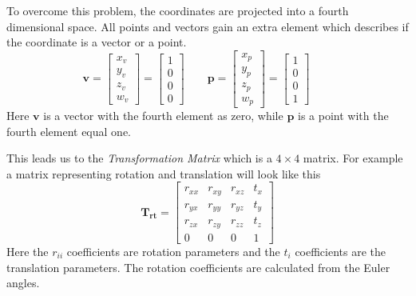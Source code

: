 To overcome this problem, the coordinates are projected into a fourth dimensional space.
All points and vectors gain an extra element which describes if the coordinate is a vector
or a point. 
\begin{equation}
        \mathbf{v} = \left[ \begin{array}{c}
                                    x_v \\
                                    y_v \\
                                    z_v \\
                                    w_v  \end{array} \right]  =
                     \left[ \begin{array}{c}
                                    1 \\
                                    0 \\
                                    0 \\
                                    0  \end{array} \right] \quad \quad
        \mathbf{p} = \left[ \begin{array}{c}
                                    x_p \\
                                    y_p \\
                                    z_p \\
                                    w_p  \end{array} \right]  =
                     \left[ \begin{array}{c}
                                    1 \\
                                    0 \\
                                    0 \\
                                    1  \end{array} \right] \quad \quad
\end{equation}
Here $\mathbf{v}$ is a vector with the fourth element as zero, while $\mathbf{p}$ is a
point with the fourth element equal one.

This leads us to the \emph{Transformation Matrix} which is a $4 \times 4$ matrix. For
example a matrix representing rotation and translation will look like this
\begin{equation}
    \label{chap2:eq-TransformationMatrix}
    \mathbf{T_{rt}} = \left [ \begin{array}{cccc}
                                r_{xx} & r_{xy} & r_{xz} & t_x \\
                                r_{yx} & r_{yy} & r_{yz} & t_y \\
                                r_{zx} & r_{zy} & r_{zz} & t_z \\
                                0  & 0  & 0  & 1  \end{array} \right]
\end{equation}
Here the $r_{ii}$ coefficients are rotation parameters and the $t_i$ coefficients are the
translation parameters. The rotation coefficients are calculated from the Euler angles.

